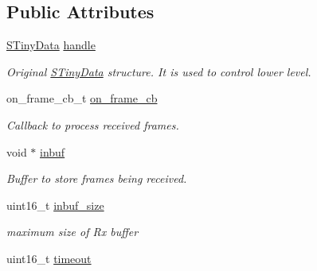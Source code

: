 \subsection*{Public Attributes}
\begin{DoxyCompactItemize}
\item 
\hypertarget{structSTinyHdData___a0df5a323cbbfd49fb138b14bca73f14c}{}\hyperlink{structSTinyData}{S\+Tiny\+Data} \hyperlink{structSTinyHdData___a0df5a323cbbfd49fb138b14bca73f14c}{handle}\label{structSTinyHdData___a0df5a323cbbfd49fb138b14bca73f14c}

\begin{DoxyCompactList}\small\item\em Original \hyperlink{structSTinyData}{S\+Tiny\+Data} structure. It is used to control lower level. \end{DoxyCompactList}\item 
\hypertarget{structSTinyHdData___abf8a0eb5006769a92adc186554a3a1c0}{}on\+\_\+frame\+\_\+cb\+\_\+t \hyperlink{structSTinyHdData___abf8a0eb5006769a92adc186554a3a1c0}{on\+\_\+frame\+\_\+cb}\label{structSTinyHdData___abf8a0eb5006769a92adc186554a3a1c0}

\begin{DoxyCompactList}\small\item\em Callback to process received frames. \end{DoxyCompactList}\item 
\hypertarget{structSTinyHdData___a69a6bb34b580bcfa5e13112cb7652d1d}{}void $\ast$ \hyperlink{structSTinyHdData___a69a6bb34b580bcfa5e13112cb7652d1d}{inbuf}\label{structSTinyHdData___a69a6bb34b580bcfa5e13112cb7652d1d}

\begin{DoxyCompactList}\small\item\em Buffer to store frames being received. \end{DoxyCompactList}\item 
\hypertarget{structSTinyHdData___adbad190a4b54eccd4da6f3c3305a54f1}{}uint16\+\_\+t \hyperlink{structSTinyHdData___adbad190a4b54eccd4da6f3c3305a54f1}{inbuf\+\_\+size}\label{structSTinyHdData___adbad190a4b54eccd4da6f3c3305a54f1}

\begin{DoxyCompactList}\small\item\em maximum size of Rx buffer \end{DoxyCompactList}\item 
\hypertarget{structSTinyHdData___a7ca4e5b23cf480d93317245010bcbe73}{}uint16\+\_\+t \hyperlink{structSTinyHdData___a7ca4e5b23cf480d93317245010bcbe73}{timeout}\label{structSTinyHdData___a7ca4e5b23cf480d93317245010bcbe73}


\end{DoxyCompactItemize}

